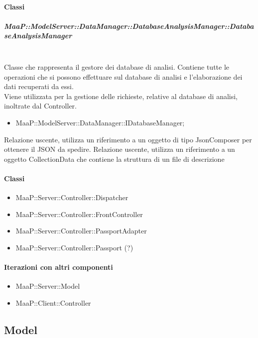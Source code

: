 \paragraph{Classi}
\subparagraph{MaaP::ModelServer::DataManager::DatabaseAnalysisManager::DatabaseAnalysisManager}
\\
Classe che rappresenta il gestore dei database di analisi. Contiene tutte le operazioni che si possono effettuare sul database di analisi e l'elaborazione dei dati recuperati da essi.\\
Viene utilizzata per la gestione delle richieste, relative al database di analisi, inoltrate dal Controller.
\begin{itemize}
\item MaaP::ModelServer::DataManager::IDatabaseManager;
\end{itemize}
     Relazione uscente, utilizza un riferimento a un oggetto di tipo JsonComposer per ottenere il JSON da spedire. 
     Relazione uscente, utilizza un riferimento a un oggetto CollectionData che contiene la struttura di un file di descrizione 




\paragraph{Classi}
\begin{itemize}
\item MaaP::Server::Controller::Dispatcher
\item MaaP::Server::Controller::FrontController
\item MaaP::Server::Controller::PassportAdapter
\item MaaP::Server::Controller::Passport (?)
\end{itemize}

\paragraph{Iterazioni con altri componenti}
\begin{itemize}
\item MaaP::Server::Model
\item MaaP::Client::Controller
\end{itemize}

\subsection{Model}
